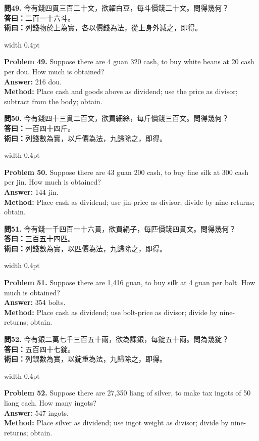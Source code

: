 \documentclass[10pt,a4paper]{article}
\newlength{\cnwidth}
\newlength{\enwidth}
\newcommand{\bilingual}[2]{%
  \noindent%
  \begin{minipage}[t]{\cnwidth}%
    #1%
  \end{minipage}%
  \hfill\vrule width 0.4pt\hfill%
  \begin{minipage}[t]{\enwidth}%
    #2%
  \end{minipage}%
  \par\smallskip%
}
\begin{document}
\bilingual{%
  \textbf{問49.}
  今有錢四貫三百二十文，欲糴白豆，每斗價錢二十文。問得幾何？\\
  \textbf{答曰：}二百一十六斗。\\
  \textbf{術曰：}列錢物於上為實，各以價錢為法，從上身外減之，即得。
}{%
  \textbf{Problem 49.}
  Suppose there are 4 guan 320 cash, to buy white beans at 20 cash per dou.
  How much is obtained?\\
  \textbf{Answer:} 216 dou.\\
  \textbf{Method:} Place cash and goods above as dividend; use the price as divisor;
  subtract from the body; obtain.
}

\bilingual{%
  \textbf{問50.}
  今有錢四十三貫二百文，欲買細絲，每斤價錢三百文。問得幾何？\\
  \textbf{答曰：}一百四十四斤。\\
  \textbf{術曰：}列錢數為實，以斤價為法，九歸除之，即得。
}{%
  \textbf{Problem 50.}
  Suppose there are 43 guan 200 cash, to buy fine silk at 300 cash per jin.
  How much is obtained?\\
  \textbf{Answer:} 144 jin.\\
  \textbf{Method:} Place cash as dividend; use jin-price as divisor; divide by
  nine-returns; obtain.
}

\bilingual{%
  \textbf{問51.}
  今有錢一千四百一十六貫，欲買絹子，每匹價錢四貫文。問得幾何？\\
  \textbf{答曰：}三百五十四匹。\\
  \textbf{術曰：}列錢數為實，以匹價為法，九歸除之，即得。
}{%
  \textbf{Problem 51.}
  Suppose there are 1,416 guan, to buy silk at 4 guan per bolt.
  How much is obtained?\\
  \textbf{Answer:} 354 bolts.\\
  \textbf{Method:} Place cash as dividend; use bolt-price as divisor; divide by
  nine-returns; obtain.
}

\bilingual{%
  \textbf{問52.}
  今有銀二萬七千三百五十兩，欲為課銀，每錠五十兩。問為幾錠？\\
  \textbf{答曰：}五百四十七錠。\\
  \textbf{術曰：}列銀數為實，以錠重為法，九歸除之，即得。
}{%
  \textbf{Problem 52.}
  Suppose there are 27,350 liang of silver, to make tax ingots of 50 liang each.
  How many ingots?\\
  \textbf{Answer:} 547 ingots.\\
  \textbf{Method:} Place silver as dividend; use ingot weight as divisor;
  divide by nine-returns; obtain.
}
\end{document}

